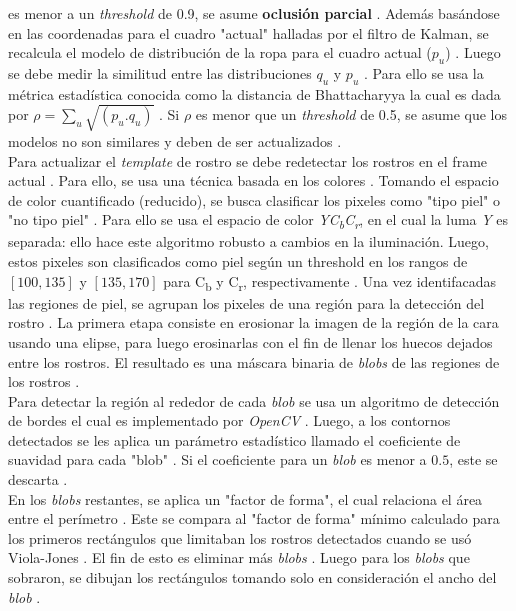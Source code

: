 \documentclass[a4paper,openright,12pt]{report}
\begin{document}
es menor a un \textit{threshold} de 0.9, se asume \textbf{oclusión parcial} \cite{shaik2007robust}.
Además basándose en las coordenadas para el cuadro "actual" halladas por el
filtro de Kalman, se recalcula el modelo de distribución de la ropa para el
cuadro actual ($p_{u}$) \cite{shaik2007robust}. Luego se debe medir la similitud entre las
distribuciones $q_{u}$ y $p_{u}$ \cite{shaik2007robust}. Para ello se usa la métrica estadística
conocida como la distancia de Bhattacharyya la cual es dada por
$\rho = \sum_{u}\sqrt{(p_{u}.q_{u})}$ \cite{shaik2007robust}. Si $\rho$ es menor que un
\textit{threshold} de 0.5, se asume que los modelos no son similares y deben de
ser actualizados \cite{shaik2007robust}.\\
Para actualizar el \textit{template} de rostro se debe redetectar los rostros en
el frame actual \cite{shaik2007robust}. Para ello, se usa una técnica basada en los colores \cite{shaik2007robust}. Tomando el
espacio de color cuantificado (reducido), se busca clasificar los pixeles como
"tipo piel" o "no tipo piel" \cite{shaik2007robust}. Para ello se usa el espacio de color
\textit{YC\textsubscript{b}C\textsubscript{r}}, en el cual la luma \textit{Y} es
separada: ello hace este algoritmo robusto a cambios en la iluminación. Luego,
estos pixeles son clasificados como piel según un threshold en los rangos de
$[100,135]$ y $[135,170]$ para C\textsubscript{b} y C\textsubscript{r},
respectivamente \cite{shaik2007robust}. Una vez identifacadas las regiones de piel, se agrupan los
pixeles de una región para la detección del rostro \cite{shaik2007robust}. La primera etapa consiste en
erosionar la imagen de la región de la cara usando una elipse, para luego
erosinarlas con el fin de llenar los huecos dejados entre los rostros. El
resultado es una máscara binaria de \textit{blobs} de las regiones de los
rostros \cite{shaik2007robust}.\\

Para detectar la región al rededor de cada \textit{blob} se usa un algoritmo
de detección de bordes el cual es implementado por \textit{OpenCV} \cite{shaik2007robust}. Luego, a los
contornos detectados se les aplica un parámetro estadístico llamado el
coeficiente de suavidad para cada "blob" \cite{shaik2007robust}. Si el coeficiente para un
\textit{blob} es menor a $0.5$, este se descarta \cite{shaik2007robust}.\\

En los \textit{blobs} restantes, se aplica un "factor de forma", el cual
relaciona el área entre el perímetro \cite{shaik2007robust}. Este se compara al "factor de forma"
mínimo calculado para los primeros rectángulos que limitaban los rostros
detectados cuando se usó Viola-Jones \cite{shaik2007robust}. El fin de esto es eliminar más
\textit{blobs} \cite{shaik2007robust}. Luego para los \textit{blobs} que sobraron, se dibujan los
rectángulos tomando solo en consideración el ancho del \textit{blob} \cite{shaik2007robust}.\\
\end{document}
